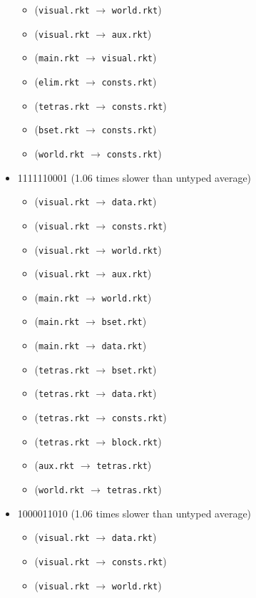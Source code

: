 \documentclass{article}
\newcommand{\mono}[1]{\texttt{#1}}
\begin{document}
\begin{itemize}
\begin{itemize}
  \item (\mono{visual.rkt} $\rightarrow$ \mono{world.rkt})
  \item (\mono{visual.rkt} $\rightarrow$ \mono{aux.rkt})
  \item (\mono{main.rkt} $\rightarrow$ \mono{visual.rkt})
  \item (\mono{elim.rkt} $\rightarrow$ \mono{consts.rkt})
  \item (\mono{tetras.rkt} $\rightarrow$ \mono{consts.rkt})
  \item (\mono{bset.rkt} $\rightarrow$ \mono{consts.rkt})
  \item (\mono{world.rkt} $\rightarrow$ \mono{consts.rkt})
  \end{itemize}
\item 1111110001 (1.06 times slower than untyped average)
  \begin{itemize}
  \item (\mono{visual.rkt} $\rightarrow$ \mono{data.rkt})
  \item (\mono{visual.rkt} $\rightarrow$ \mono{consts.rkt})
  \item (\mono{visual.rkt} $\rightarrow$ \mono{world.rkt})
  \item (\mono{visual.rkt} $\rightarrow$ \mono{aux.rkt})
  \item (\mono{main.rkt} $\rightarrow$ \mono{world.rkt})
  \item (\mono{main.rkt} $\rightarrow$ \mono{bset.rkt})
  \item (\mono{main.rkt} $\rightarrow$ \mono{data.rkt})
  \item (\mono{tetras.rkt} $\rightarrow$ \mono{bset.rkt})
  \item (\mono{tetras.rkt} $\rightarrow$ \mono{data.rkt})
  \item (\mono{tetras.rkt} $\rightarrow$ \mono{consts.rkt})
  \item (\mono{tetras.rkt} $\rightarrow$ \mono{block.rkt})
  \item (\mono{aux.rkt} $\rightarrow$ \mono{tetras.rkt})
  \item (\mono{world.rkt} $\rightarrow$ \mono{tetras.rkt})
  \end{itemize}
\item 1000011010 (1.06 times slower than untyped average)
  \begin{itemize}
  \item (\mono{visual.rkt} $\rightarrow$ \mono{data.rkt})
  \item (\mono{visual.rkt} $\rightarrow$ \mono{consts.rkt})
  \item (\mono{visual.rkt} $\rightarrow$ \mono{world.rkt})

\end{itemize}
\end{itemize}
\end{document}
